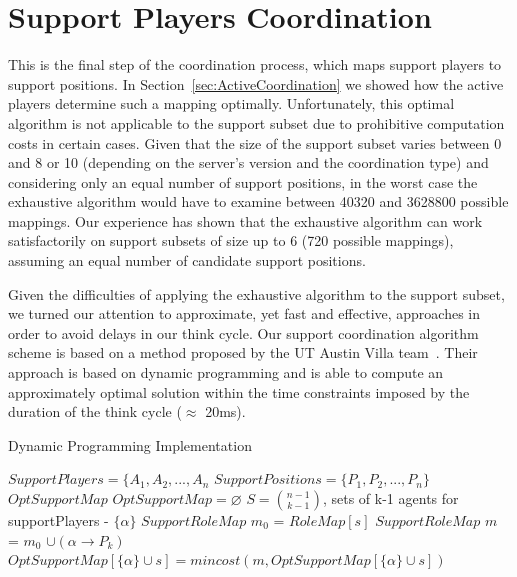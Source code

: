 \section{Support Players Coordination}
This is the final step of the coordination process, which maps support players to support positions. In Section~\ref{sec:ActiveCoordination} we showed how the active players determine such a mapping optimally. Unfortunately, this optimal algorithm is not applicable to the support subset due to prohibitive computation costs in certain cases. Given that the size of the support subset varies between 0 and 8 or 10 (depending on the server's version and the coordination type) and considering only an equal number of support positions, in the worst case the exhaustive algorithm would have to examine between 40320 and 3628800 possible mappings. Our experience has shown that the exhaustive algorithm can work satisfactorily on support subsets of size up to 6 (720 possible mappings), assuming an equal number of candidate support positions.  

Given the difficulties of applying the exhaustive algorithm to the support subset, we turned our attention to approximate, yet fast and effective, approaches in order to avoid delays in our think cycle. Our support coordination algorithm scheme is based on a method proposed by the UT Austin Villa team~\cite{UtAustinVillaPaper}. Their approach is based on dynamic programming and is able to compute an approximately optimal solution within the time constraints imposed by the duration of the think cycle ($\approx$ 20ms).

\begin{algorithm}[t!]
\caption{Dynamic Programming Implementation}
\label{alg3}
\begin{algorithmic}[1]
$SupportPlayers = \lbrace A_{1},A_{2},...,A_{n} $
\STATE $SupportPositions = \lbrace P_{1},P_{2},...,P_{n} \rbrace $
$OptSupportMap$
\STATE $OptSupportMap = \varnothing $
\STATE $ S = {{n-1}\choose{k-1}} $, sets of k-1 agents for supportPlayers - $\lbrace \alpha \rbrace$
\STATE $SupportRoleMap$ $m_{0}$ = $RoleMap[s]$
\STATE $SupportRoleMap$ $m$ = $m_{0}$ $ \cup (\alpha \rightarrow P_{k})$
\STATE $OptSupportMap[\lbrace \alpha \rbrace \cup s] = mincost(m,OptSupportMap[\lbrace \alpha \rbrace \cup s])$
\ENDFOR
\ENDFOR
\ENDFOR
\end{algorithmic}
\end{algorithm}

